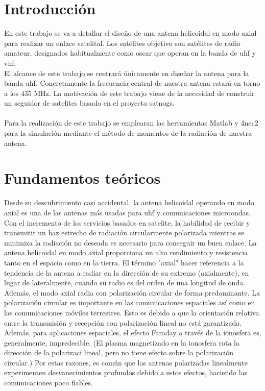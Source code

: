 \documentclass[12pt]{article}
\begin{document}
\tableofcontents
\pagebreak


\section{Introducción}
En este trabajo se va a detallar el diseño de una antena helicoidal en modo axial para realizar un enlace satelital. Los satélites objetivo son satélites de radio amateur, designados habitualmente como \gls{oscar} que operan en la banda de \gls{uhf} y \gls{vhf}. \\
El alcance de este trabajo se centrará únicamente en diseñar la antena para la banda \gls{uhf}. Concretamente la frecuencia central de nuestra antena estará en torno a los 435 MHz.
La motivación de este trabajo viene de la necesidad de construir un seguidor de satelites basado en el proyecto \gls{satnogs}.\\\\
Para la realización de este trabajo se emplearan las herramientas Matlab y 4nec2 para la simulación mediante el método de momentos de la radiación de nuestra antena.

\newpage
\section{Fundamentos teóricos}
Desde su descubrimiento casi accidental, la antena helicoidal operando en modo axial es una de las antenas más usadas para \gls{uhf} y comunicaciones microondas. Con el incremento de los servicios basados en satelite, la habilidad de recibir y transmitir un haz estrecho de radiación circularmente polarizada mientras se minimiza la radiación no deseada es necesario para conseguir un buen enlace.
La antena helicoidal en modo axial proporciona un alto rendimiento y resistencia tanto en el espacio como en la tierra. El término "axial" hacer referencia a la tendencia de la antena a radiar en la dirección de su extremo (axialmente), en lugar de lateralmente, cuando su radio es del orden de una longitud de onda. Además, el modo axial radia con polarización circular de forma predominante. La polarización circular es importante en las comunicaciones espaciales así como en las comunicaciones móviles terrestres. Esto es debido a que la orientación relativa entre la transmisión y recepción con polarización lineal no está garantizada. Además, para aplicaciones espaciales, el efecto Faraday a través de la ionosfera es, generalmente, impredecible. (El plasma magnetizado en la ionosfera rota la dirección de la polarizaci lineal, pero no tiene efecto sobre la polarización circular.) Por estas razones, es común que las antenas polarizadas linealmente experimenten desvanecimientos profundos debido a estos efectos, haciendo las comunicaciones poco fiables. 
\end{document}
